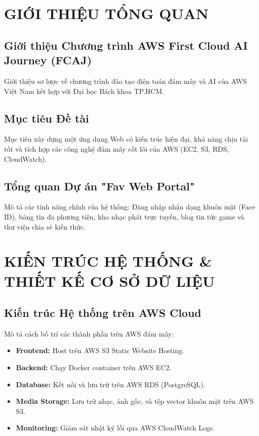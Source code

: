 \documentclass[12pt,a4paper]{report}
\begin{document}
\tableofcontents
\newpage

\chapter{GIỚI THIỆU TỔNG QUAN}
\section{Giới thiệu Chương trình AWS First Cloud AI Journey (FCAJ)}
Giới thiệu sơ lược về chương trình đào tạo điện toán đám mây và AI của AWS Việt Nam kết hợp với Đại học Bách khoa TP.HCM.

\section{Mục tiêu Đề tài}
Mục tiêu xây dựng một ứng dụng Web có kiến trúc hiện đại, khả năng chịu tải tốt và tích hợp các công nghệ đám mây cốt lõi của AWS (EC2, S3, RDS, CloudWatch).

\section{Tổng quan Dự án "Fav Web Portal"}
Mô tả các tính năng chính của hệ thống: Đăng nhập nhận dạng khuôn mặt (Face ID), bảng tin đa phương tiện, kho nhạc phát trực tuyến, blog tin tức game và thư viện chia sẻ kiến thức.

\chapter{KIẾN TRÚC HỆ THỐNG \& THIẾT KẾ CƠ SỞ DỮ LIỆU}
\section{Kiến trúc Hệ thống trên AWS Cloud}
Mô tả cách bố trí các thành phần trên AWS đám mây:
\begin{itemize}
    \item \textbf{Frontend:} Host trên AWS S3 Static Website Hosting.
    \item \textbf{Backend:} Chạy Docker container trên AWS EC2.
    \item \textbf{Database:} Kết nối và lưu trữ trên AWS RDS (PostgreSQL).
    \item \textbf{Media Storage:} Lưu trữ nhạc, ảnh gốc, và tệp vector khuôn mặt trên AWS S3.
    \item \textbf{Monitoring:} Giám sát nhật ký lỗi qua AWS CloudWatch Logs.
\end{itemize}
\end{document}
